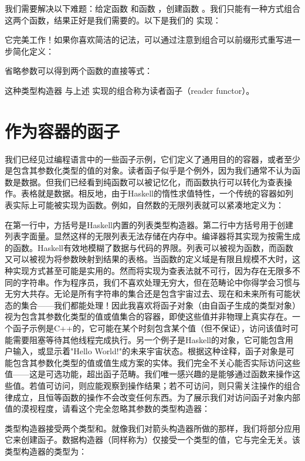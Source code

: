 我们需要解决以下难题：给定函数  和函数 ，创建函数 。我们只能有一种方式组合这两个函数，结果正好是我们需要的。以下是我们的  实现：

它完美工作！如果你喜欢简洁的记法，可以通过注意到组合可以前缀形式重写进一步简化定义：

省略参数可以得到两个函数的直接等式：

这种类型构造器  与上述  实现的组合称为读者函子（reader functor）。

\section{作为容器的函子}

我们已经见过编程语言中的一些函子示例，它们定义了通用目的的容器，或者至少是包含其参数化类型的值的对象。读者函子似乎是个例外，因为我们通常不认为函数是数据。但我们已经看到纯函数可以被记忆化，而函数执行可以转化为查表操作。表格就是数据。相反地，由于Haskell的惰性求值特性，一个传统的容器如列表实际上可能被实现为函数。例如，自然数的无限列表就可以紧凑地定义为：

在第一行中，方括号是Haskell内置的列表类型构造器。第二行中方括号用于创建列表字面量。显然这样的无限列表无法存储在内存中。编译器将其实现为按需生成的函数。Haskell有效地模糊了数据与代码的界限。列表可以被视为函数，而函数又可以被视为将参数映射到结果的表格。当函数的定义域是有限且规模不大时，这种实现方式甚至可能是实用的。然而将实现为查表法就不可行，因为存在无限多不同的字符串。作为程序员，我们不喜欢处理无穷大，但在范畴论中你得学会习惯与无穷大共存。无论是所有字符串的集合还是包含宇宙过去、现在和未来所有可能状态的集合——我们都能处理！因此我喜欢将函子对象（由自函子生成的类型对象）视为包含其参数化类型的值或值集合的容器，即使这些值并非物理上真实存在。一个函子示例是C++的，它可能在某个时刻包含某个值（但不保证），访问该值时可能需要阻塞等待其他线程完成执行。另一个例子是Haskell的对象，它可能包含用户输入，或显示着"Hello World!"的未来宇宙状态。根据这种诠释，函子对象是可能包含其参数化类型的值或值生成方案的实体。我们完全不关心能否实际访问这些值——这是可选功能，超出函子范畴。我们唯一感兴趣的是能够通过函数来操作这些值。若值可访问，则应能观察到操作结果；若不可访问，则只需关注操作的组合律成立，且恒等函数的操作不会改变任何东西。为了展示我们对访问函子对象内部值的漠视程度，请看这个完全忽略其参数的类型构造器：

类型构造器接受两个类型和。就像我们对箭头构造器所做的那样，我们将部分应用它来创建函子。数据构造器（同样称为）仅接受一个类型的值，它与完全无关。该类型构造器的类型为：

